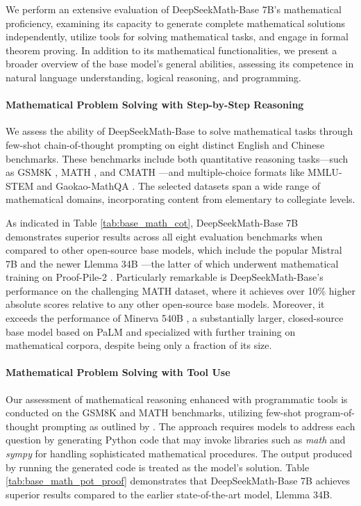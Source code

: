 \begin{itemize}[topsep=0pt]
We perform an extensive evaluation of DeepSeekMath-Base 7B's mathematical proficiency, examining its capacity to generate complete mathematical solutions independently, utilize tools for solving mathematical tasks, and engage in formal theorem proving. In addition to its mathematical functionalities, we present a broader overview of the base model's general abilities, assessing its competence in natural language understanding, logical reasoning, and programming.

\paragraph{Mathematical Problem Solving with Step-by-Step Reasoning}

We assess the ability of DeepSeekMath-Base to solve mathematical tasks through few-shot chain-of-thought prompting \citep{cot} on eight distinct English and Chinese benchmarks. These benchmarks include both quantitative reasoning tasks—such as GSM8K \citep{gsm8k}, MATH \citep{MATH}, and CMATH \citep{wei2023cmath}—and multiple-choice formats like MMLU-STEM \citep{mmlu} and Gaokao-MathQA \citep{agieval}. The selected datasets span a wide range of mathematical domains, incorporating content from elementary to collegiate levels.

As indicated in Table \ref{tab:base_math_cot}, DeepSeekMath-Base 7B demonstrates superior results across all eight evaluation benchmarks when compared to other open-source base models, which include the popular Mistral 7B \citep{mistral} and the newer Llemma 34B \citep{llemma}—the latter of which underwent mathematical training on Proof-Pile-2 \citep{llemma}. Particularly remarkable is DeepSeekMath-Base’s performance on the challenging MATH dataset, where it achieves over 10\% higher absolute scores relative to any other open-source base models. Moreover, it exceeds the performance of Minerva 540B \citep{minerva}, a substantially larger, closed-source base model based on PaLM \citep{palm} and specialized with further training on mathematical corpora, despite being only a fraction of its size.

\paragraph{Mathematical Problem Solving with Tool Use} Our assessment of mathematical reasoning enhanced with programmatic tools is conducted on the GSM8K and MATH benchmarks, utilizing few-shot program-of-thought prompting as outlined by \citet{pot,pal}. The approach requires models to address each question by generating Python code that may invoke libraries such as \textit{math} and \textit{sympy} for handling sophisticated mathematical procedures. The output produced by running the generated code is treated as the model’s solution. Table \ref{tab:base_math_pot_proof} demonstrates that DeepSeekMath-Base 7B achieves superior results compared to the earlier state-of-the-art model, Llemma 34B.


\end{itemize}
